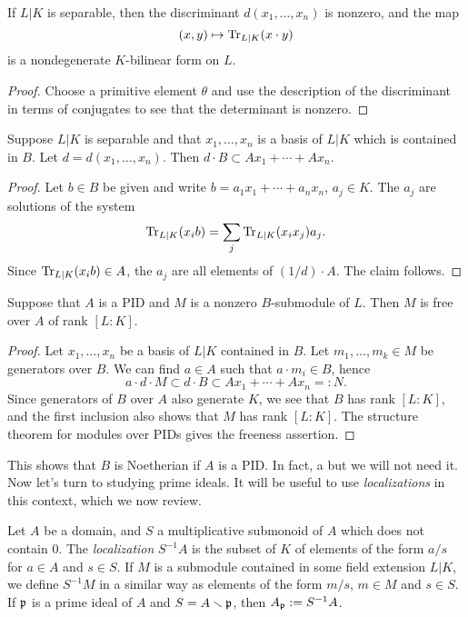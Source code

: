 \begin{lemma}
  If $L|K$ is separable, then the discriminant $d(x_{1},\ldots,x_{n})$ is nonzero, and the map
  \[ (x,y) \mapsto \operatorname{Tr}_{L|K}(x \cdot y) \]
  is a nondegenerate $K$-bilinear form on $L$.
\end{lemma}
\begin{proof}
  Choose a primitive element $\theta$ and use the description of the discriminant in terms of conjugates to see that the determinant is nonzero.
\end{proof}

\begin{lemma}
  Suppose $L|K$ is separable and that $x_{1},\ldots,x_{n}$ is a basis of $L|K$ which is contained in $B$.
  Let $d = d(x_{1},\ldots,x_{n})$.
  Then $d \cdot B \subset A x_{1} + \cdots + A x_{n}$.
\end{lemma}
\begin{proof}
  Let $b \in B$ be given and write $b = a_{1} x_{1} + \cdots + a_{n} x_{n}$, $a_{j} \in K$.
  The $a_{j}$ are solutions of the system
  \[ \operatorname{Tr}_{L|K}(x_{i} b) = \sum_{j} \operatorname{Tr}_{L|K}(x_{i}x_{j}) a_{j}. \]
  Since $\operatorname{Tr}_{L|K}(x_{i} b) \in A$, the $a_{j}$ are all elements of $(1/d) \cdot A$.
  The claim follows.
\end{proof}

\begin{proposition}
  Suppose that $A$ is a PID and $M$ is a nonzero $B$-submodule of $L$.
  Then $M$ is free over $A$ of rank $[L:K]$.
\end{proposition}
\begin{proof}
  Let $x_{1},\ldots,x_{n}$ be a basis of $L|K$ contained in $B$.
  Let $m_{1},\ldots,m_{k} \in M$ be generators over $B$.
  We can find $a \in A$ such that $a \cdot m_{i} \in B$, hence
  \[ a \cdot d \cdot M \subset d \cdot B \subset A x_{1} + \cdots + A x_{n} =: N. \]
  Since generators of $B$ over $A$ also generate $K$, we see that $B$ has rank $[L:K]$, and the first inclusion also shows that $M$ has rank $[L:K]$.
  The structure theorem for modules over PIDs gives the freeness assertion.
\end{proof}

This shows that $B$ is Noetherian if $A$ is a PID.
In fact, a  but we will not need it.
Now let's turn to studying prime ideals.
It will be useful to use \emph{localizations} in this context, which we now review.

Let $A$ be a domain, and $S$ a multiplicative submonoid of $A$ which does not contain $0$.
The \emph{localization} $S^{-1}A$ is the subset of $K$ of elements of the form $a/s$ for $a \in A$ and $s \in S$.
If $M$ is a submodule contained in some field extension $L|K$, we define $S^{-1}M$ in a similar way as elements of the form $m/s$, $m \in M$ and $s \in S$.
If $\mathfrak{p}$ is a prime ideal of $A$ and $S = A \smallsetminus \mathfrak{p}$, then $A_{\mathfrak{p}} := S^{-1}A$.

